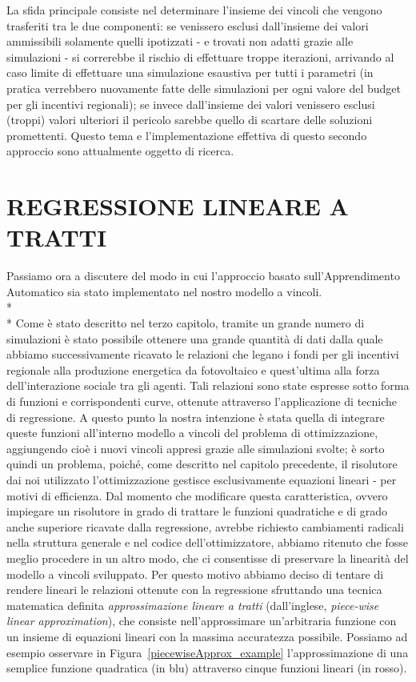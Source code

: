 \documentclass[12pt,a4paper,openright,twoside]{report}
\begin{document}
La sfida principale consiste nel determinare l'insieme dei vincoli che vengono trasferiti tra le due componenti: se venissero esclusi dall'insieme dei valori ammissibili solamente quelli ipotizzati - e trovati non adatti grazie alle simulazioni - si correrebbe il rischio di effettuare troppe iterazioni, arrivando al caso limite di effettuare una simulazione esaustiva per tutti i parametri (in pratica verrebbero nuovamente fatte delle simulazioni per ogni valore del budget per gli incentivi regionali); se invece dall'insieme dei valori  venissero esclusi (troppi) valori ulteriori il pericolo sarebbe quello di scartare delle soluzioni promettenti. Questo tema e l'implementazione effettiva di questo secondo approccio sono attualmente oggetto di ricerca.

\section{REGRESSIONE LINEARE A TRATTI}
Passiamo ora a discutere del modo in cui l'approccio basato sull'Apprendimento Automatico sia stato implementato nel nostro modello a vincoli.
\\*\\*
Come è stato descritto nel terzo capitolo, tramite un grande numero di simulazioni è stato possibile ottenere una grande quantità di dati dalla quale abbiamo successivamente ricavato le relazioni che legano i fondi per gli incentivi regionale alla produzione energetica da fotovoltaico e quest'ultima alla forza dell'interazione sociale tra gli agenti. Tali relazioni sono state espresse sotto forma di funzioni e corrispondenti curve, ottenute attraverso l'applicazione di tecniche di regressione. A questo punto la nostra intenzione è stata quella di integrare queste funzioni all'interno modello a vincoli del problema di ottimizzazione, aggiungendo cioè i nuovi vincoli appresi grazie alle simulazioni svolte; è sorto quindi un problema, poiché, come descritto nel capitolo precedente, il risolutore dai noi utilizzato l'ottimizzazione gestisce esclusivamente equazioni lineari - per motivi di efficienza. Dal momento che modificare questa caratteristica, ovvero impiegare un risolutore in grado di trattare le funzioni quadratiche e di grado anche superiore ricavate dalla regressione, avrebbe richiesto cambiamenti radicali nella struttura generale e nel codice dell'ottimizzatore, abbiamo ritenuto che fosse meglio procedere in un altro modo, che ci consentisse di preservare la linearità del modello a vincoli sviluppato. Per questo motivo abbiamo deciso di tentare di rendere lineari le relazioni  ottenute con la regressione sfruttando una tecnica matematica definita \emph{approssimazione lineare a tratti} \cite{piecewiseApprox,cattafi} (dall'inglese, \emph{piece-wise linear approximation}), che consiste nell'approssimare un'arbitraria funzione con un insieme di equazioni lineari con la massima accuratezza possibile. Possiamo ad esempio osservare in Figura~\ref{piecewiseApprox_example} l'approssimazione di una semplice funzione quadratica (in blu) attraverso cinque funzioni lineari (in rosso). 
\end{document}
